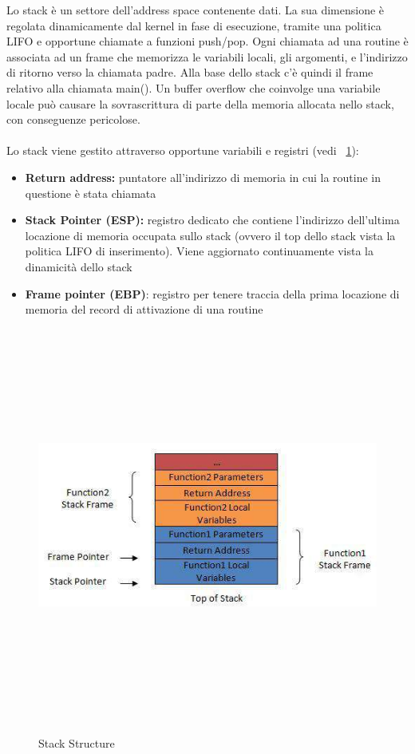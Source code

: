 Lo stack è un settore dell'address space contenente dati. La sua dimensione è regolata dinamicamente dal kernel
in fase di esecuzione, tramite una politica LIFO e opportune chiamate a funzioni push/pop. Ogni chiamata ad una routine è associata ad un frame che memorizza le variabili locali, gli argomenti, e l'indirizzo di ritorno verso la chiamata padre. Alla base dello stack c'è quindi il frame relativo alla chiamata main(). Un buffer overflow che coinvolge una variabile locale può causare la sovrascrittura di parte della memoria allocata nello stack, con conseguenze pericolose. \\ \\
Lo stack viene gestito attraverso opportune variabili e registri (vedi \figurename~\ref{fig:stack_struct}):
\begin{itemize}
  \item \textbf{Return address:} puntatore all'indirizzo di memoria in cui la routine in questione è stata chiamata
  \item \textbf{Stack Pointer (ESP):} registro dedicato che contiene l'indirizzo dell'ultima locazione di memoria occupata sullo stack (ovvero il top dello stack vista la politica LIFO di inserimento). Viene aggiornato continuamente vista la dinamicità dello stack
  \item \textbf{Frame pointer (EBP)}: registro per tenere traccia della prima locazione di memoria del record di attivazione di una routine
\end{itemize}
\begin{figure}[htbp]
	\centering%
	\subfigure%
	{\includegraphics[height=13cm, width=13cm, keepaspectratio]{Immagini/sistemi_operativi/buffer.png}}
	\caption{Stack Structure \label{fig:stack_struct}} 	
\end{figure}
